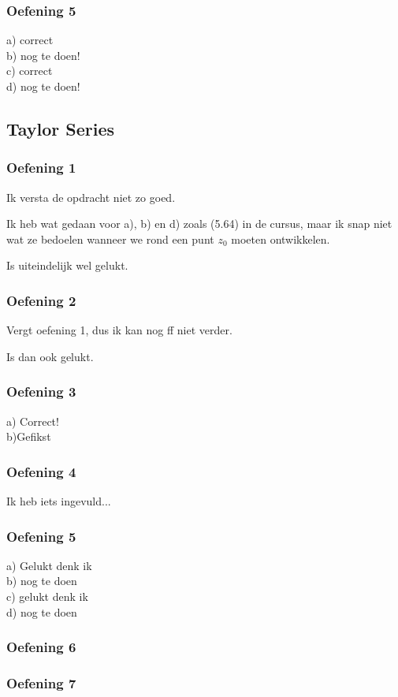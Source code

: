 \documentclass[a4paper,twoside]{article}
\theoremstyle{definition}
\theoremstyle{plain}
\begin{document}
\subsubsection{Oefening 5}
a) correct\\
b) nog te doen!\\
c) correct\\
d) nog te doen!\\
\subsection{Taylor Series}
\subsubsection{Oefening 1}
Ik versta de opdracht niet zo goed.

Ik heb wat gedaan voor a), b) en d) zoals (5.64) in de cursus, maar ik snap niet wat ze bedoelen wanneer we rond een punt \(z_0\) moeten ontwikkelen.

Is uiteindelijk wel gelukt.
\subsubsection{Oefening 2}
Vergt oefening 1, dus ik kan nog ff niet verder.

Is dan ook gelukt.
\subsubsection{Oefening 3}
a) Correct!\\
b)Gefikst

\subsubsection{Oefening 4}
Ik heb iets ingevuld...
\subsubsection{Oefening 5}
a) Gelukt denk ik \\
b) nog te doen\\
c) gelukt denk ik\\
d) nog te doen\\
\subsubsection{Oefening 6}
\subsubsection{Oefening 7}
\end{document}
